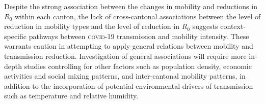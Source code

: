 Despite the strong association between the changes in mobility and reductions in $R_0$ within each canton, the lack of cross-cantonal associations between the level of reduction in mobility types and the level of reduction in $R_0$ suggests context-specific pathways between \textsc{covid}-19 transmission and mobility intensity. These warrants caution in attempting to apply general relations between mobility and transmission reduction. Investigation of general associations will require more in-depth studies controlling for other factors such as population density, economic activities and social mixing patterns, and inter-cantonal mobility patterns, in addition to the incorporation of potential environmental drivers of transmission such as temperature and relative humidity\cite{Neher:PotentialImpactSeasonal:2020, Kissler:ProjectingTransmissionDynamics:2020}. 
  
